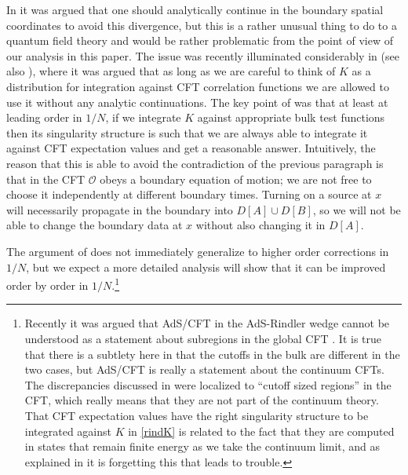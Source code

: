 \documentclass[12pt]{article}
\newcommand{\mO}{\mathcal{O}}
\begin{document}
In \cite{Hamilton:2006az} it was argued that one should analytically continue in the boundary spatial coordinates to avoid this divergence, but this is a rather unusual thing to do to a quantum field theory and would be rather problematic from the point of view of our analysis in this paper.  The issue was recently illuminated considerably in \cite{Morrison:2014jha} (see also \cite{Papadodimas:2012aq}), where it was argued that as long as we are careful to think of $K$ as a distribution for integration against CFT correlation functions we are allowed to use it without any analytic continuations.  The key point of \cite{Morrison:2014jha} was that at least at leading order in $1/N$, if we integrate $K$ against appropriate bulk test functions then its singularity structure is such that we are always able to integrate it against CFT expectation values
and get a reasonable answer.  Intuitively, the reason that this is able to avoid the contradiction of the previous paragraph is that in the CFT $\mO$ obeys a boundary equation of motion; we are not free to choose it independently at different boundary times.  Turning on a source at $x$ will necessarily propagate in the boundary into $D[A]\cup D[B]$, so we will not be able to change the boundary data at $x$ without also changing it in $D[A]$.    

The argument of \cite{Morrison:2014jha} does not immediately generalize to higher order corrections in $1/N$, but we expect a more detailed analysis will show that it can be improved order by order in $1/N$.\footnote{Recently it was argued that AdS/CFT in the AdS-Rindler wedge cannot be understood as a statement about subregions in the global CFT \cite{Chowdhury:2014oba}.  It is true that there is a subtlety here in that the cutoffs in the bulk are different in the two cases, but AdS/CFT is really a statement about the continuum CFTs.  The discrepancies discussed in \cite{Chowdhury:2014oba} were localized to ``cutoff sized regions'' in the CFT, which really means that they are not part of the continuum theory.  That CFT expectation values have the right singularity structure to be integrated against $K$ in \eqref{rindK} is related to the fact that they are computed in states that remain finite energy as we take the continuum limit, and as explained in \cite{Morrison:2014jha} it is forgetting this that leads to trouble.}
 
\end{document}
